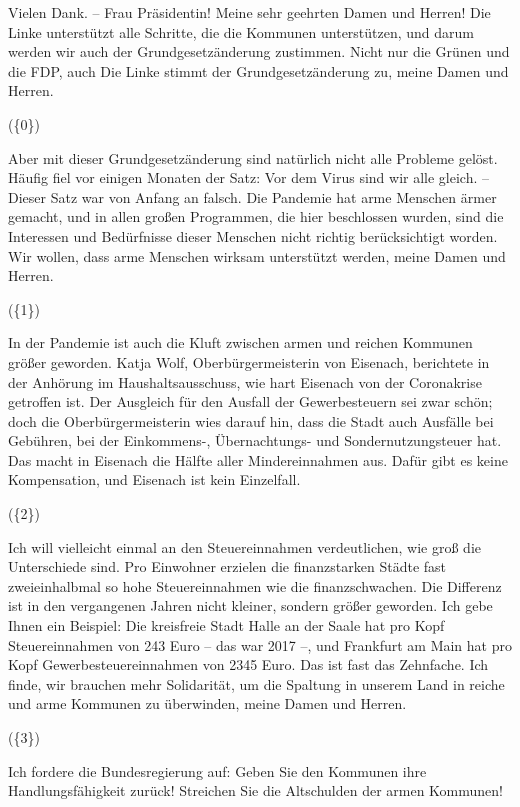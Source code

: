 \begin{example}[H]
    Vielen Dank. – Frau Präsidentin! Meine sehr geehrten Damen und Herren! Die Linke unterstützt alle Schritte, die die Kommunen unterstützen, und darum werden wir auch der Grundgesetzänderung zustimmen. Nicht nur die Grünen und die FDP, auch Die Linke stimmt der Grundgesetzänderung zu, meine Damen und Herren.

    (\{0\})

    Aber mit dieser Grundgesetzänderung sind natürlich nicht alle Probleme gelöst. Häufig fiel vor einigen Monaten der Satz: Vor dem Virus sind wir alle gleich. – Dieser Satz war von Anfang an falsch. Die Pandemie hat arme Menschen ärmer gemacht, und in allen großen Programmen, die hier beschlossen wurden, sind die Interessen und Bedürfnisse dieser Menschen nicht richtig berücksichtigt worden. Wir wollen, dass arme Menschen wirksam unterstützt werden, meine Damen und Herren.

    (\{1\})

    In der Pandemie ist auch die Kluft zwischen armen und reichen Kommunen größer geworden. Katja Wolf, Oberbürgermeisterin von Eisenach, berichtete in der Anhörung im Haushaltsausschuss, wie hart Eisenach von der Coronakrise getroffen ist. Der Ausgleich für den Ausfall der Gewerbesteuern sei zwar schön; doch die Oberbürgermeisterin wies darauf hin, dass die Stadt auch Ausfälle bei Gebühren, bei der Einkommens-, Übernachtungs- und Sondernutzungsteuer hat. Das macht in Eisenach die Hälfte aller Mindereinnahmen aus. Dafür gibt es keine Kompensation, und Eisenach ist kein Einzelfall.

    (\{2\})

    Ich will vielleicht einmal an den Steuereinnahmen verdeutlichen, wie groß die Unterschiede sind. Pro Einwohner erzielen die finanzstarken Städte fast zweieinhalbmal so hohe Steuereinnahmen wie die finanzschwachen. Die Differenz ist in den vergangenen Jahren nicht kleiner, sondern größer geworden. Ich gebe Ihnen ein Beispiel: Die kreisfreie Stadt Halle an der Saale hat pro Kopf Steuereinnahmen von 243 Euro – das war 2017 –, und Frankfurt am Main hat pro Kopf Gewerbesteuereinnahmen von 2345 Euro. Das ist fast das Zehnfache. Ich finde, wir brauchen mehr Solidarität, um die Spaltung in unserem Land in reiche und arme Kommunen zu überwinden, meine Damen und Herren.

    (\{3\})

    Ich fordere die Bundesregierung auf: Geben Sie den Kommunen ihre Handlungsfähigkeit zurück! Streichen Sie die Altschulden der armen Kommunen!


\end{example}
